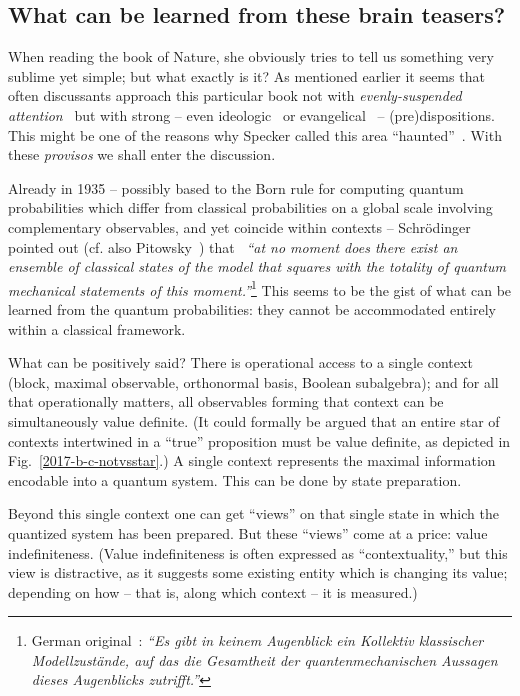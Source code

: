 \subsection{What can be learned from these brain teasers?}

When reading the book of Nature, she obviously tries to tell us something very sublime yet simple;
but what exactly is it?
As mentioned earlier it seems that often discussants approach this particular book not with
{\em evenly-suspended attention}~\cite{Freud-1912,Freud-1912-e} but with strong
-- even ideologic~\cite{clauser-talkvie} or evangelical~\cite{zeil-05_nature_ofQuantum}
-- (pre)dispositions.
This might be one of the reasons why Specker called this area ``haunted''~\cite{Specker-priv-Oct2000}.
With these {\em provisos} we shall enter the discussion.


Already in 1935 -- possibly
based to the Born rule for computing quantum probabilities which
differ from classical probabilities on a global scale involving complementary observables,
and yet coincide within contexts --
Schr\"odinger pointed out (cf. also Pitowsky~\cite[footnote~2, p.~96]{Pit-94})
that~\cite[p.~327]{schrodinger-en-10.2307/986572}
{\em ``at no moment does there exist an ensemble of classical states of the model
that squares with the totality of quantum mechanical statements of this moment.''}\footnote{
German original~\cite[p.~811]{schrodinger}:
{\em ``Es gibt in keinem Augenblick ein Kollektiv klassischer Modellzust\"ande,
auf das die Gesamtheit der quantenmechanischen Aussagen dieses Augenblicks zutrifft.''}}
This seems to be the gist of what can be learned from the quantum probabilities:
they cannot be accommodated entirely within a classical framework.

What can be positively said?
There is operational access to a single  context (block, maximal observable, orthonormal basis, Boolean subalgebra);
and for all that operationally matters, all observables forming that context can be simultaneously value definite.
(It could formally be argued that an entire star of contexts intertwined in a ``true'' proposition
must be value definite, as depicted in Fig.~\ref{2017-b-c-notvsstar}.)
A single context represents the maximal information encodable into a quantum system.
This can be done by state preparation.


Beyond this single context
one can get ``views'' on that single state in which the quantized system has been prepared.
But these ``views'' come at a price: value indefiniteness.
(Value indefiniteness is often expressed as ``contextuality,'' but this view is distractive,
as it suggests some existing entity which is changing
its value; depending on how -- that is, along which context -- it is measured.)

